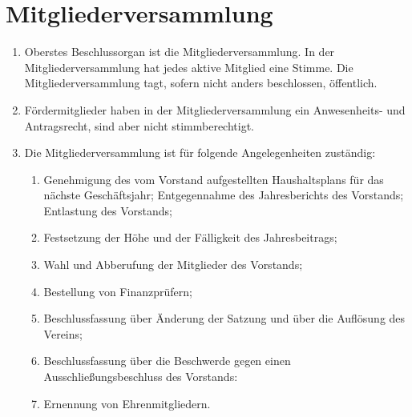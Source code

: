 \chapter{Mitgliederversammlung}
\begin{enumerate}
	\item Oberstes Beschlussorgan ist die Mitgliederversammlung. In der Mitgliederversammlung hat jedes aktive Mitglied eine Stimme. Die Mitgliederversammlung tagt, sofern nicht anders beschlossen, öffentlich.
	\item Fördermitglieder haben in der Mitgliederversammlung ein Anwesenheits- und Antragsrecht, sind aber nicht stimmberechtigt.
	\item Die Mitgliederversammlung ist für folgende Angelegenheiten zuständig:
		\begin{enumerate}[1)]
			\item Genehmigung des vom Vorstand aufgestellten Haushaltsplans für das nächste Geschäftsjahr; Entgegennahme des Jahresberichts des Vorstands; Entlastung des Vorstands;
			\item Festsetzung der Höhe und der Fälligkeit des Jahresbeitrags;
			\item Wahl und Abberufung der Mitglieder des Vorstands;
			\item Bestellung von Finanzprüfern;
			\item Beschlussfassung über Änderung der Satzung und über die Auflösung des Vereins;
			\item Beschlussfassung über die Beschwerde gegen einen Ausschließungsbeschluss des Vorstands:
			\item Ernennung von Ehrenmitgliedern.
		\end{enumerate}
\end{enumerate}

